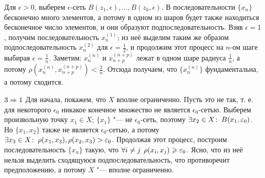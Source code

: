 \documentclass[main]{subfiles}
\begin{document}
\begin{itemproof}
  Для \( \epsilon > 0 \), выберем
  \( \epsilon \)-сеть \( B(z_1, \epsilon), \dots, B(z_k, \epsilon) \).
  В последовательности \( \{ x_n \} \) бесконечно много элементов,
  а потому в одном из шаров будет также находиться
  бесконечное число элементов, и они образуют подпоследовательность.
  Взяв \( \epsilon = 1 \), получим последовательность
  \( x_n^{(1)} \); из неё выделим таким же образом
  подпоследовательность \( x_n^{(2)} \) для \( \epsilon = \frac{1}{2} \),
  и продолжим этот процесс на \( n \)-ом шаге выбирая
  \( \epsilon = \frac{1}{n} \).
  Заметим: \( x_n^{(n)} \) и \( x_{n+p}^{(n+p)} \)
  лежат в одном шаре радиуса \( \frac{1}{n} \),
  а потому \( \rho(x_n^{(n)}, x_{n+p}^{(n+p)}) < \frac{2}{n} \).
  Отсюда получаем, что \( \{ x_n^{(n)} \} \) фундаментальна,
  а потому сходится.
\item[$3 \Rightarrow 1$]
  Для начала, покажем, что \( X \) вполне ограниченно.
  Пусть это не так, т. е. для некоторого \( \epsilon_0 \)
  никакое конечное множество не является \( \epsilon_0 \)-сетью.
  Выберем произвольную точку \( x_1 \in X \);
  \( \{ x_1 \} \) "--- не \( \epsilon_0 \)-сеть,
  поэтому \( \exists x_2 \in X \colon \: B(x_1, \varepsilon_0) \).
  Но \( \{ x_1, x_2 \} \) также не является \( \epsilon_0 \)-сетью,
  а потому \( \exists x_3 \in X \colon \: \rho(x_1, x_3), \rho(x_2, x_3) > \varepsilon_0 \).
  Продолжая этот процесс, построим последовательность \( \{ x_n \} \)
  такую, что \( \forall {i \ne j} \; \, \rho(x_i, x_j) \geqslant \varepsilon_0 \).
  Ясно, что из неё нельзя выделить сходящуюся подпоследовательность,
  что противоречит предположению, а потому \( X \) "--- вполне ограниченно.


\end{itemproof}
\end{document}
